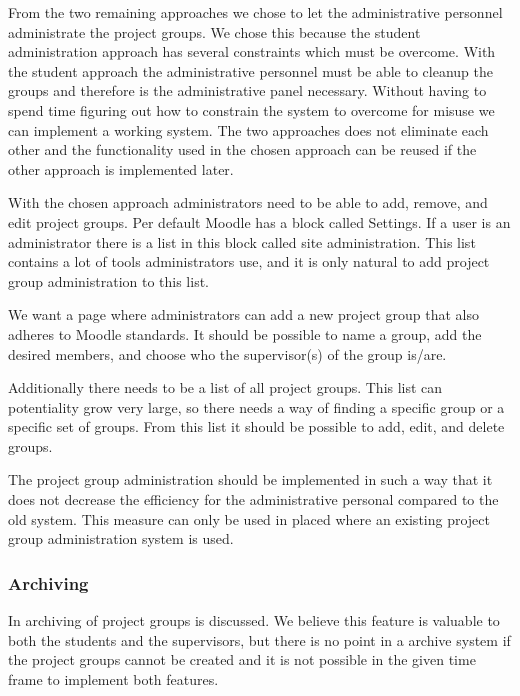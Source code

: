From the two remaining approaches we chose to let the administrative personnel administrate the project groups. 
We chose this because the student administration approach has several constraints which must be overcome. 
With the student approach the administrative personnel must be able to cleanup the groups and therefore is the administrative panel necessary. 
Without having to spend time figuring out how to constrain the system to overcome for misuse we can implement a working system. 
The two approaches does not eliminate each other and the functionality used in the chosen approach can be reused if the other approach is implemented later.

With the chosen approach administrators need to be able to add, remove, and edit project groups.
Per default Moodle has a block called Settings. 
If a user is an administrator there is a list in this block called site administration. 
This list contains a lot of tools administrators use, and it is only natural to add project group administration to this list. 

We want a page where administrators can add a new project group that also adheres to Moodle standards.
It should be possible to name a group, add the desired members, and choose who the supervisor(s) of the group is/are.

Additionally there needs to be a list of all project groups.
This list can potentiality grow very large, so there needs a way of finding a specific group or a specific set of groups. 
From this list it should be possible to add, edit, and delete groups. 

The project group administration should be implemented in such a way that it does not decrease the efficiency for the administrative personal compared to the old system. 
This measure can only be used in placed where an existing project group administration system is used.

\subsubsection{Archiving}
In  archiving of project groups is discussed. 
We believe this feature is valuable to both the students and the supervisors, but there is no point in a archive system if the project groups cannot be created and it is not possible in the given time frame to implement both features. 
